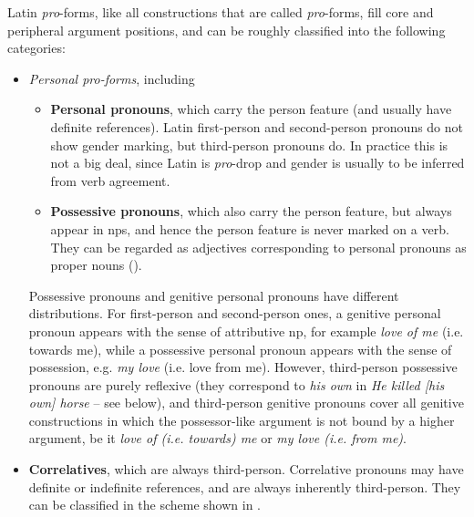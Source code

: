 \documentclass{article}
\newcommand*{\concept}[1]{\textbf{#1}}
\newcommand*{\term}[1]{\emph{#1}}
\newcommand*{\corpus}[1]{\emph{#1}}
\begin{document}
Latin \term{pro}-forms, like all constructions that are called \term{pro}-forms, 
fill core and peripheral argument positions, 
and can be roughly classified into the following categories:
\begin{itemize}
    \item \emph{Personal \term{pro}-forms}, including
    \begin{itemize}
        \item \concept{Personal pronouns}, which carry the person feature (and usually have definite references).
        Latin first-person and second-person pronouns do not show gender marking,
        but third-person pronouns do.
        In practice this is not a big deal,
        since Latin is \term{pro}-drop and 
        gender is usually to be inferred from verb agreement.
        \item \concept{Possessive pronouns}, which also carry the person feature,
        but always appear in \ac{np}s,
        and hence the person feature is never marked on a verb.
        They can be regarded as adjectives corresponding to personal pronouns as proper nouns 
        ().
    \end{itemize}

    Possessive pronouns and genitive personal pronouns have different distributions.
    For first-person and second-person ones,
    a genitive personal pronoun appears with the sense of attributive \ac{np}, for example
    \corpus{love of me} (i.e. towards me),
    while a possessive personal pronoun appears with the sense of possession,
    e.g. \corpus{my love} (i.e. love from me).
    However, third-person possessive pronouns are purely reflexive 
    (they correspond to \corpus{his own} in \corpus{He killed [his own] horse} -- see below),
    and third-person genitive pronouns cover all genitive constructions 
    in which the possessor-like argument is not bound by a higher argument,
    be it \corpus{love of (i.e. towards) me} or \corpus{my love (i.e. from me)}.

    \item \concept{Correlatives}, which are always third-person. 
    Correlative pronouns may have definite or indefinite references,
    and are always inherently third-person.
    They can be classified in the scheme shown in .


\end{itemize}
\end{document}
